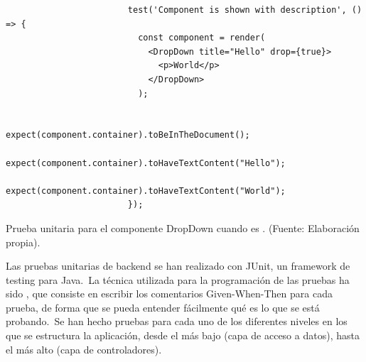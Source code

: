 \begin{codeBlock}
	\begin{verbatim}
						test('Component is shown with description', () => {
						  const component = render(
						    <DropDown title="Hello" drop={true}>
						      <p>World</p>
						    </DropDown>
						  );

						  expect(component.container).toBeInTheDocument();
						  expect(component.container).toHaveTextContent("Hello");
						  expect(component.container).toHaveTextContent("World");
						});
	\end{verbatim}
	\caption{Prueba unitaria para el componente DropDown cuando  es .
		(Fuente: Elaboración propia).}
	\label{code:prueba-unitaria-dropdown-true}
\end{codeBlock}


Las pruebas unitarias de backend se han realizado con JUnit, un framework de testing para Java.\ La técnica utilizada
para la programación de las pruebas ha sido , que consiste en escribir los
comentarios Given-When-Then para cada prueba, de forma que se pueda entender fácilmente qué es lo que se está
probando.\ Se han hecho pruebas para cada uno de los diferentes niveles en los que se estructura la aplicación, desde
el más bajo (capa de acceso a datos), hasta el más alto (capa de controladores).

